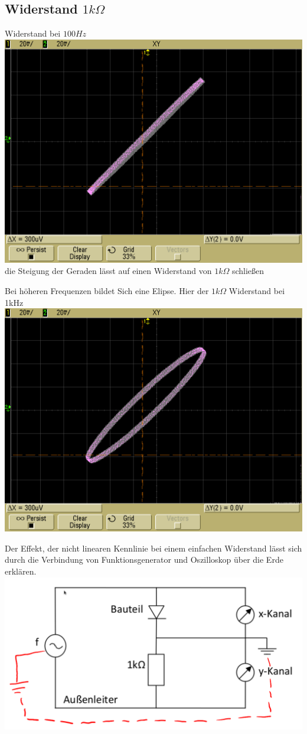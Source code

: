 \documentclass[compress,11pt]{beamer}
\begin{document}
\subsection{Widerstand $1k\Omega$}
\begin{frame}
Widerstand bei $100Hz$
\includegraphics[width=\textwidth]{images/scope_5}
die Steigung der Geraden lässt auf einen Widerstand von $1k\Omega$ schließen
\end{frame}
\begin{frame}
Bei höheren Frequenzen bildet Sich eine Elipse. Hier der $1k\Omega$ Widerstand bei 1kHz
\includegraphics[width=\textwidth]{images/scope_6}
\end{frame}
\begin{frame}
Der Effekt, der nicht linearen Kennlinie bei einem einfachen Widerstand lässt sich durch die Verbindung von Funktionsgenerator und Oszilloskop über die Erde erklären.
\includegraphics[width=\textwidth]{images/3-erde.png}
\end{frame}
\end{document}
